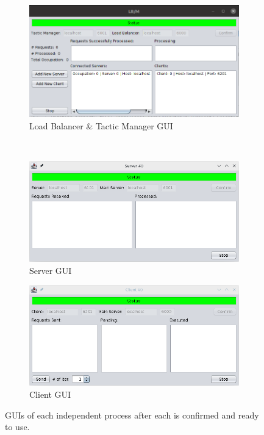 \documentclass[12pt]{article}
\begin{document}
\begin{figure}[H]
  \centering
  \begin{subfigure}{.55\textwidth}
    \centering
    \includegraphics[width=.95\linewidth]{img/LBM_confirmed.png}
    \caption{Load Balancer \& Tactic Manager GUI}
    \label{fig:LBM_confirmed}
  \end{subfigure} \\
  \begin{subfigure}{.5\textwidth}
    \centering
    \includegraphics[width=.95\linewidth]{img/S_confirmed.png}
    \caption{Server GUI}
    \label{fig:S_confirmed}
  \end{subfigure}%
  \begin{subfigure}{.5\textwidth}
    \centering
    \includegraphics[width=.95\linewidth]{img/C_confirmed.png}
    \caption{Client GUI}
    \label{fig:C_confirmed}
  \end{subfigure}
  \caption{GUIs of each independent process after each is confirmed and ready to use.}
  \label{fig:GUIs_confirmed}
\end{figure}
\end{document}
